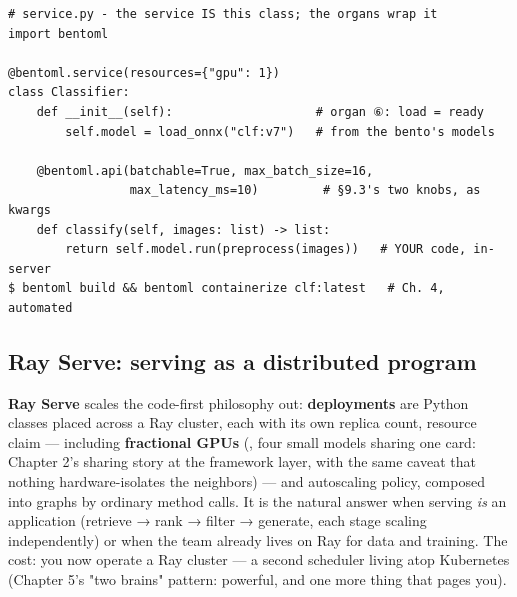 \begin{terminalbox}
\begin{Verbatim}[breaklines=true,breakanywhere=true,fontsize=\small,formatcom=\color{tbbtermfg},codes=\tbbcodeactive]
# service.py - the service IS this class; the organs wrap it
import bentoml

@bentoml.service(resources={"gpu": 1})
class Classifier:
    def __init__(self):                    # organ ⑥: load = ready
        self.model = load_onnx("clf:v7")   # from the bento's models

    @bentoml.api(batchable=True, max_batch_size=16,
                 max_latency_ms=10)         # §9.3's two knobs, as kwargs
    def classify(self, images: list) -> list:
        return self.model.run(preprocess(images))   # YOUR code, in-server
$ bentoml build && bentoml containerize clf:latest   # Ch. 4, automated
\end{Verbatim}
\end{terminalbox}

\subsection*{Ray Serve: serving as a distributed program}

\textbf{Ray Serve} scales the code-first philosophy out: \textbf{deployments} are Python classes placed across a Ray cluster, each with its own replica count, resource claim — including \textbf{fractional GPUs} (, four small models sharing one card: Chapter 2's sharing story at the framework layer, with the same caveat that nothing hardware-isolates the neighbors) — and autoscaling policy, composed into graphs by ordinary method calls. It is the natural answer when serving \textit{is} an application (retrieve → rank → filter → generate, each stage scaling independently) or when the team already lives on Ray for data and training. The cost: you now operate a Ray cluster — a second scheduler living atop Kubernetes (Chapter 5's "two brains" pattern: powerful, and one more thing that pages you).

